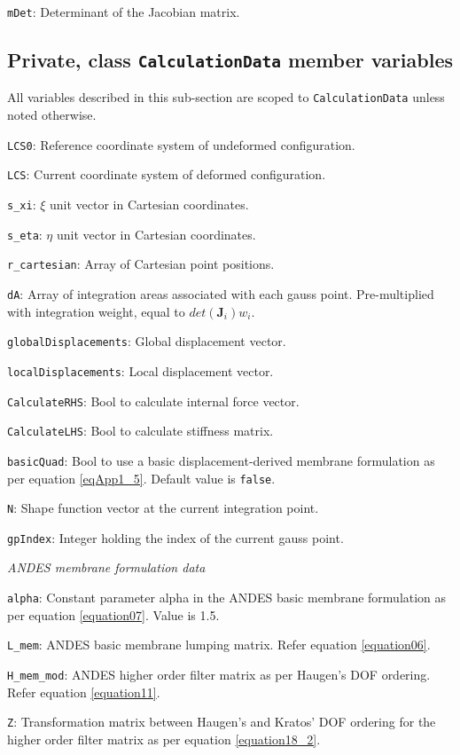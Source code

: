 \texttt{mDet}: Determinant of the Jacobian matrix.

\subsection{Private, class \texttt{CalculationData} member variables}
All variables described in this sub-section are scoped to \texttt{CalculationData} unless noted otherwise.

\texttt{LCS0}: Reference coordinate system of undeformed configuration.

\texttt{LCS}: Current coordinate system of deformed configuration.

\texttt{s\_xi}: $\xi$ unit vector in Cartesian coordinates.

\texttt{s\_eta}: $\eta$ unit vector in Cartesian coordinates.

\texttt{r\_cartesian}: Array of Cartesian point positions.

\texttt{dA}: Array of integration areas associated with each gauss point. Pre-multiplied with integration weight, equal to $det(\mathbf{J}_i) w_i$.

\texttt{globalDisplacements}: Global displacement vector.

\texttt{localDisplacements}: Local displacement vector.

\texttt{CalculateRHS}: Bool to calculate internal force vector.

\texttt{CalculateLHS}: Bool to calculate stiffness matrix.

\texttt{basicQuad}: Bool to use a basic displacement-derived membrane formulation as per equation \ref{eqApp1_5}. Default value is \texttt{false}.

\texttt{N}: Shape function vector at the current integration point.

\texttt{gpIndex}: Integer holding the index of the current gauss point.

\textit{ANDES membrane formulation data}

\texttt{alpha}: Constant parameter alpha in the ANDES basic membrane formulation as per equation \ref{equation07}. Value is 1.5.

\texttt{L\_mem}: ANDES basic membrane lumping matrix. Refer equation \ref{equation06}.

\texttt{H\_mem\_mod}: ANDES higher order filter matrix as per Haugen's DOF ordering. Refer equation \ref{equation11}.

\texttt{Z}: Transformation matrix between Haugen's and Kratos' DOF ordering for the higher order filter matrix as per equation \ref{equation18_2}.

